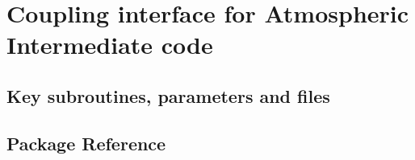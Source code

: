 \section{Coupling interface for Atmospheric Intermediate code}
\label{sec:aim_compon_interf}
\subsection{Key subroutines, parameters and files}
\label{sec:pkg:aim_compon_interf:implementation_synopsis}
\subsection{Package Reference}
